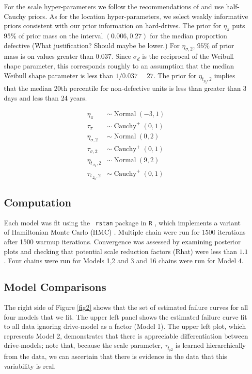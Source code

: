 \documentclass[12pt]{article}
\newcommand{\op}{\operatorname}
\begin{document}
For the scale hyper-parameters we follow the recommendations of \citet{gelman2014bayesian} and use half-Cauchy priors. As for the location hyper-parameters, we select weakly informative priors consistent with our prior information on hard-drives. The prior for $\eta_\pi$ puts 95\% of prior mass on the interval $(0.006, 0.27)$ for the median proportion defective (What justification? Should maybe be lower.) For $\eta_{\sigma, 2}$, $95\%$ of prior mass is on values greater than $0.037$. Since $\sigma_d$ is the reciprocal of the Weibull shape parameter, this corresponds roughly to an assumption that the median Weibull shape parameter is less than $1/0.037 = 27$. The prior for $\eta_{t_{p_2},2}$ implies that the median 20th percentile for non-defective units is less than greater than 3 days and less than 24 years.

\begin{align*}
  \eta_{\pi} & \sim \op{Normal}(-3, 1)\\
  \tau_{\pi} & \sim \op{Cauchy}^+(0, 1)\\
  \eta_{\sigma ,2} & \sim \op{Normal}(0, 2)\\
  \tau_{\sigma ,2} & \sim \op{Cauchy}^+(0, 1)\\
  \eta_{t_{.2_2},2} & \sim \op{Normal}(9, 2)\\
  \tau_{t_{.2_2},2} & \sim \op{Cauchy}^+(0, 1)
 \end{align*} 

\subsection{Computation}
\label{sec:Computation}
Each model was fit using the {\tt
  rstan}\cite{rstan} package in {\tt R} \cite{r}, which implements a variant of Hamiltonian Monte Carlo (HMC)
\cite{betancourt}. Multiple chain were run for 1500 iterations after 1500 warmup iterations. Convergence was assessed by examining posterior
plots and checking that potential scale reduction factors (Rhat) \cite{gelman2014bayesian} were less than $1.1$. Four chains were run for Models 1,2 and 3 and 16 chains were run for Model 4.



\subsection{Model Comparisons}
\label{sec:Model Comparisons}
The right side of Figure \ref{fig2} shows that the set of estimated failure curves for all four models that we fit. The upper left panel shows the estimated failure curve fit to all data ignoring drive-model as a factor (Model 1). The upper left plot, which represents Model 2, demonstrates that there is appreciable differentiation between drive-models; note that, because the scale parameter, $\tau_{t_{p2}}$ is learned hierarchically from the data, we can ascertain that there is evidence in the data that this variability is real.
\end{document}
